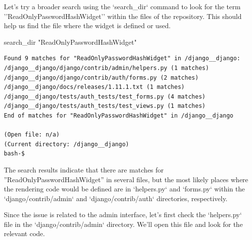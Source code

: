 {\begin{agentbox}
Let's try a broader search using the `search\_dir` command to look for the term ''ReadOnlyPasswordHashWidget'' within the files of the repository. This should help us find the file where the widget is defined or used.

\hrulefill
\begin{CodeVerbatim}[breaklines=true, breakanywhere=true]
search_dir "ReadOnlyPasswordHashWidget"
\end{CodeVerbatim}
\end{agentbox}
\begin{observationbox}\begin{Verbatim}[breaklines=true, breakanywhere=true]
Found 9 matches for "ReadOnlyPasswordHashWidget" in /django__django:
/django__django/django/contrib/admin/helpers.py (1 matches)
/django__django/django/contrib/auth/forms.py (2 matches)
/django__django/docs/releases/1.11.1.txt (1 matches)
/django__django/tests/auth_tests/test_forms.py (4 matches)
/django__django/tests/auth_tests/test_views.py (1 matches)
End of matches for "ReadOnlyPasswordHashWidget" in /django__django

(Open file: n/a)
(Current directory: /django__django)
bash-$
\end{Verbatim}
\end{observationbox}
\begin{agentbox}
The search results indicate that there are matches for ''ReadOnlyPasswordHashWidget'' in several files, but the most likely places where the rendering code would be defined are in `helpers.py` and `forms.py` within the `django/contrib/admin` and `django/contrib/auth` directories, respectively.



Since the issue is related to the admin interface, let's first check the `helpers.py` file in the `django/contrib/admin` directory. We'll open this file and look for the relevant code.




\end{agentbox}}
